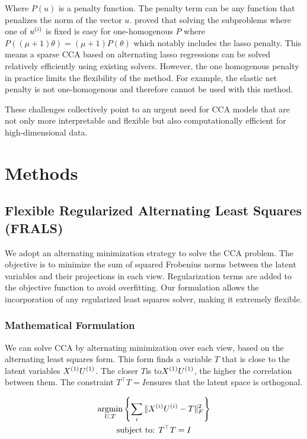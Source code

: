 Where \(P(u)\) is a penalty function.
The penalty term can be any function that penalizes the norm of the vector \(u\).
\cite{mai2019iterative} proved that solving the subproblems where one of $u^{(i)}$ is fixed is easy for one-homogenous $P$ where
\( P((\mu + 1)\theta) = (\mu + 1)P(\theta) \) which notably includes the lasso penalty.
This means a sparse CCA based
on alternating lasso regressions can be solved relatively efficiently using existing solvers.
However, the one homogenous penalty in practice limits the flexibility of the method.
For example, the elastic net penalty is not one-homogenous and therefore cannot be used with this method.

These challenges collectively point to an urgent need for CCA models that are not only more interpretable and flexible but also computationally efficient for high-dimensional data.

\section{Methods}

\subsection{Flexible Regularized Alternating Least Squares (FRALS)}\label{subsec:flexible-regularized-alternating-least
-squares-(frals)}
We adopt an alternating minimization strategy to solve the CCA problem.
The objective is to minimize the sum of squared Frobenius norms between the latent variables and their projections in each view.
Regularization terms are added to the objective function to avoid overfitting.
Our formulation allows the incorporation of any regularized least squares solver, making it extremely flexible.

\subsubsection{Mathematical Formulation}
We can solve CCA by alternating minimization over each view, based on the alternating least squares form.
This form finds a variable \( T \) that is close to the latent variables \( X^{(1)} U^{(1)} \).
The closer \( T \)is to\( X^{(1)} U^{(1)} \), the higher the correlation between them.
The constraint \( T^\top T = I \)ensures that the latent space is orthogonal.

\begin{gather*}
    \underset{U, T}{\mathrm{argmin}}\left\{\sum_i \|X^{(i)} U^{(i)} - T\|_F^2 \right\}\\
    \text{subject to: }T^\top T = I\\
\end{gather*}

